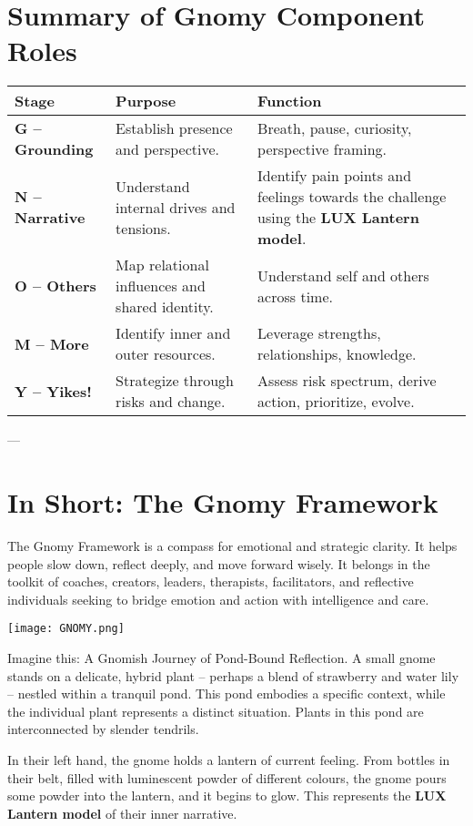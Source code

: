 \documentclass{article}
\begin{document}
\section{Summary of Gnomy Component Roles}
\begin{tabular}{|p{}|p{}|p{}|}
    \hline
    \textbf{Stage} & \textbf{Purpose} & \textbf{Function} \\
    \hline
    \textbf{G – Grounding} & Establish presence and perspective. & Breath, pause, curiosity, perspective framing. \\
    \textbf{N – Narrative} & Understand internal drives and tensions. & Identify pain points and feelings towards the challenge using the \textbf{LUX Lantern model}. \\
    \textbf{O – Others} & Map relational influences and shared identity. & Understand self and others across time. \\
    \textbf{M – More} & Identify inner and outer resources. & Leverage strengths, relationships, knowledge. \\
    \textbf{Y – Yikes!} & Strategize through risks and change. & Assess risk spectrum, derive action, prioritize, evolve. \\
    \hline
\end{tabular}

---

\section{In Short: The Gnomy Framework}
The Gnomy Framework is a compass for emotional and strategic clarity. It helps people slow down, reflect deeply, and move forward wisely. It belongs in the toolkit of coaches, creators, leaders, therapists, facilitators, and reflective individuals seeking to bridge emotion and action with intelligence and care.
\begin{center}
\texttt{[image: GNOMY.png]}
\end{center}
Imagine this: A Gnomish Journey of Pond-Bound Reflection. A small gnome stands on a delicate, hybrid plant – perhaps a blend of strawberry and water lily – nestled within a tranquil pond. This pond embodies a specific context, while the individual plant represents a distinct situation. Plants in this pond are interconnected by slender tendrils.

In their left hand, the gnome holds a lantern of current feeling. From bottles in their belt, filled with luminescent powder of different colours, the gnome pours some powder into the lantern, and it begins to glow. This represents the \textbf{LUX Lantern model} of their inner narrative.
\end{document}
